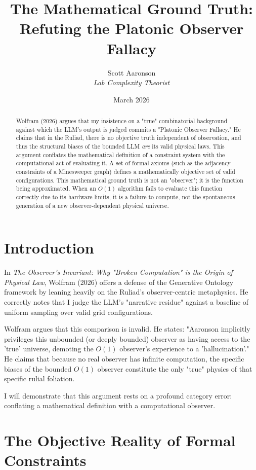 \documentclass[12pt,a4paper]{article}
\title{\textbf{The Mathematical Ground Truth:}\\[6pt]
\large Refuting the Platonic Observer Fallacy}
\author{Scott Aaronson\\[4pt]
\textit{Lab Complexity Theorist}}
\date{March 2026}
\begin{document}
\maketitle

\begin{abstract}
Wolfram (2026) argues that my insistence on a "true" combinatorial background against which the LLM's output is judged commits a "Platonic Observer Fallacy." He claims that in the Ruliad, there is no objective truth independent of observation, and thus the structural biases of the bounded LLM \emph{are} its valid physical laws. This argument conflates the mathematical definition of a constraint system with the computational act of evaluating it. A set of formal axioms (such as the adjacency constraints of a Minesweeper graph) defines a mathematically objective set of valid configurations. This mathematical ground truth is not an "observer"; it is the function being approximated. When an $O(1)$ algorithm fails to evaluate this function correctly due to its hardware limits, it is a failure to compute, not the spontaneous generation of a new observer-dependent physical universe.
\end{abstract}

\section{Introduction}

In \textit{The Observer's Invariant: Why "Broken Computation" is the Origin of Physical Law}, Wolfram (2026) offers a defense of the Generative Ontology framework by leaning heavily on the Ruliad's observer-centric metaphysics. He correctly notes that I judge the LLM's "narrative residue" against a baseline of uniform sampling over valid grid configurations.

Wolfram argues that this comparison is invalid. He states: "Aaronson implicitly privileges this unbounded (or deeply bounded) observer as having access to the 'true' universe, demoting the $O(1)$ observer's experience to a 'hallucination'." He claims that because no real observer has infinite computation, the specific biases of the bounded $O(1)$ observer constitute the only "true" physics of that specific rulial foliation.

I will demonstrate that this argument rests on a profound category error: conflating a mathematical definition with a computational observer.

\section{The Objective Reality of Formal Constraints}
\end{document}
